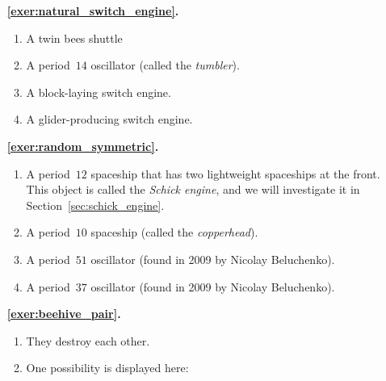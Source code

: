 \begin{multicols}{2}
	\begin{itemize}[leftmargin=0em]
		\item[\bf\color{ocre}\sffamily\ref{exer:natural_switch_engine}.] \begin{enumerate}[leftmargin=1.5em,label=\bf\color{ocre}(\alph*)]
			\item A twin bees shuttle
			
			\item A period~$14$ oscillator (called the \emph{tumbler}).
			
			\item A block-laying switch engine.
			
			\item A glider-producing switch engine. \\
		\end{enumerate}
		
		
		\item[\bf\color{ocre}\sffamily\ref{exer:random_symmetric}.] \begin{enumerate}[leftmargin=1.5em,label=\bf\color{ocre}(\alph*)]
			\item A period~$12$ spaceship that has two lightweight spaceships at the front. This object is called the \emph{Schick engine}, and we will investigate it in Section~\ref{sec:schick_engine}.
			
			\item A period~$10$ spaceship (called the \emph{copperhead}).
			
			\item A period~$51$ oscillator (found in 2009 by Nicolay Beluchenko).
			
			\item A period~$37$ oscillator (found in 2009 by Nicolay Beluchenko). \\
		\end{enumerate}
	
	
		\item[\bf\color{ocre}\sffamily\ref{exer:beehive_pair}.] \begin{enumerate}[leftmargin=1.5em,label=\bf\color{ocre}(\alph*)]
			\item They destroy each other.
			
			\item One possibility is displayed here: \\[-0.6em]
			
			 \\
		\end{enumerate}
		

\end{itemize}
\end{multicols}
